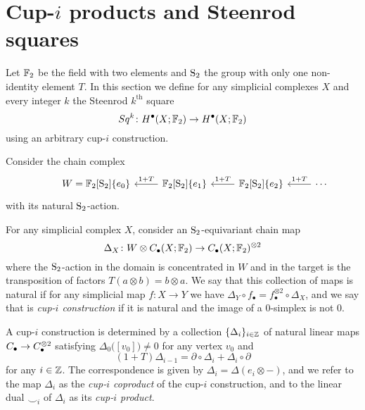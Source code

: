 
\section{Cup-$i$ products and Steenrod squares} \label{s:squares}

Let $\F_2$ be the field with two elements and $\S_2$ the group with only one non-identity element $T$.
In this section we define for any simplicial complexes $X$ and every integer $k$ the Steenrod $k^{\mathrm{th}}$ square
\begin{equation*}
Sq^k \colon H^\bullet(X; \F_2) \to H^{\bullet}(X; \F_2)
\end{equation*}
using an arbitrary cup-$i$ construction.

Consider the chain complex
\begin{equation*}
\begin{tikzcd}[column sep=normal]
& W =  \F_2[\S_2]\{e_0\} & \arrow[l, "1+T"'] \F_2[\S_2]\{e_1\} & \arrow[l, "1+T"']
\F_2[\S_2]\{e_2\} & \arrow[l, "1+T"'] \cdots
\end{tikzcd}
\end{equation*}
with its natural $\S_2$-action.

For any simplicial complex $X$, consider an $\S_2$-equivariant chain map
\begin{equation} \label{e:steenrod diagonal}
\Delta_X \colon W \otimes \chains(X; \F_2) \to \chains(X; \F_2)^{\otimes 2}
\end{equation}
where the $\S_2$-action in the domain is concentrated in $W$ and in the target is the transposition of factors $T(a \otimes b) = b \otimes a$.
We say that this collection of maps is natural if for any simplicial map $f \colon X \to Y$ we have $\Delta_Y \circ f_\bullet = f_\bullet^{\otimes 2} \circ \Delta_X$, and we say that is \textit{cup-$i$ construction} if it is natural and the image of a $0$-simplex is not 0.

A cup-$i$ construction is determined by a collection $\{\Delta_i\}_{i \in \Z}$ of natural linear maps $\chains \to \chains^{\otimes 2}$ satisfying $\Delta_0 \big([v_0]\big) \neq 0$ for any vertex $v_0$ and
\begin{equation} \label{e:boundary of cup-i}
(1 + T) \Delta_{i-1} = \partial \circ \Delta_i + \Delta_i \circ \partial
\end{equation}
for any $i \in \Z$.
The correspondence is given by $\Delta_i = \Delta(e_i \otimes -)$, and we refer to the map $\Delta_i$ as the \textit{cup-$i$ coproduct} of the cup-$i$ construction, and to the linear dual $\smallsmile_i$ of $\Delta_i$ as its \textit{cup-$i$ product}.

